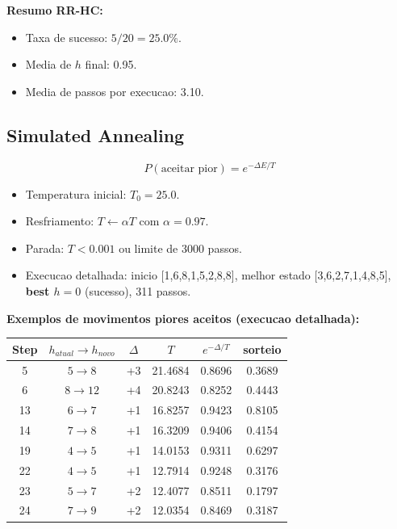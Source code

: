 \textbf{Resumo RR-HC:}
\begin{itemize}[leftmargin=1.5em]
  \item Taxa de sucesso: $5/20 = 25.0\%$.
  \item Media de $h$ final: 0.95.
  \item Media de passos por execucao: 3.10.
\end{itemize}

\subsection{Simulated Annealing}
\[
P(\text{aceitar pior}) = e^{-\Delta E / T}
\]
\begin{itemize}[leftmargin=1.5em]
  \item Temperatura inicial: $T_0 = 25.0$.
  \item Resfriamento: $T \leftarrow \alpha T$ com $\alpha = 0.97$.
  \item Parada: $T < 0.001$ ou limite de 3000 passos.
  \item Execucao detalhada: inicio [1,6,8,1,5,2,8,8], melhor estado [3,6,2,7,1,4,8,5], \textbf{best $h=0$} (sucesso), 311 passos.
\end{itemize}

\textbf{Exemplos de movimentos piores aceitos (execucao detalhada):}
\begingroup
\scriptsize
\begin{table}[H]
\centering
\begin{tabular}{c c c c c c}
\toprule
Step & $h_{atual}\rightarrow h_{novo}$ & $\Delta$ & $T$ & $e^{-\Delta/T}$ & sorteio \\
\midrule
5  & $5\rightarrow8$  & +3 & 21.4684 & 0.8696 & 0.3689 \\
6  & $8\rightarrow12$ & +4 & 20.8243 & 0.8252 & 0.4443 \\
13 & $6\rightarrow7$  & +1 & 16.8257 & 0.9423 & 0.8105 \\
14 & $7\rightarrow8$  & +1 & 16.3209 & 0.9406 & 0.4154 \\
19 & $4\rightarrow5$  & +1 & 14.0153 & 0.9311 & 0.6297 \\
22 & $4\rightarrow5$  & +1 & 12.7914 & 0.9248 & 0.3176 \\
23 & $5\rightarrow7$  & +2 & 12.4077 & 0.8511 & 0.1797 \\
24 & $7\rightarrow9$  & +2 & 12.0354 & 0.8469 & 0.3187 \\
\bottomrule
\end{tabular}
\end{table}
\endgroup

